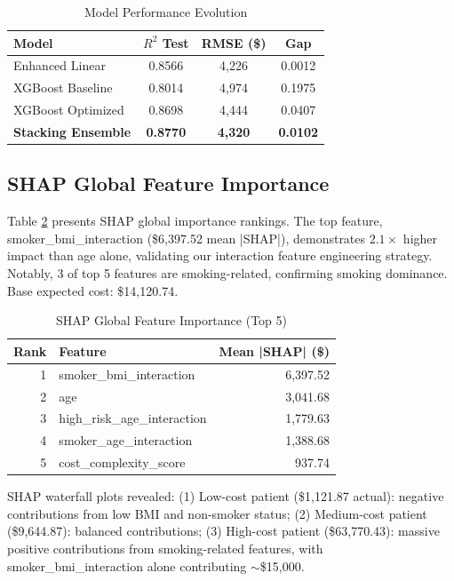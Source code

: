 \documentclass[conference]{IEEEtran}
\begin{document}
\begin{table}[htbp]
\caption{Model Performance Evolution}
\begin{center}
\begin{tabular}{|l|c|c|c|}
\hline
\textbf{Model} & \textbf{$R^2$ Test} & \textbf{RMSE (\$)} & \textbf{Gap} \\
\hline
Enhanced Linear & 0.8566 & 4,226 & 0.0012 \\
XGBoost Baseline & 0.8014 & 4,974 & 0.1975 \\
XGBoost Optimized & 0.8698 & 4,444 & 0.0407 \\
\textbf{Stacking Ensemble} & \textbf{0.8770} & \textbf{4,320} & \textbf{0.0102} \\
\hline
\end{tabular}
\label{tab:performance}
\end{center}
\end{table}

\subsection{SHAP Global Feature Importance}
Table \ref{tab:shap} presents SHAP global importance rankings. The top feature, smoker\_bmi\_interaction (\$6,397.52 mean |SHAP|), demonstrates $2.1\times$ higher impact than age alone, validating our interaction feature engineering strategy. Notably, 3 of top 5 features are smoking-related, confirming smoking dominance. Base expected cost: \$14,120.74.

\begin{table}[htbp]
\caption{SHAP Global Feature Importance (Top 5)}
\begin{center}
\begin{tabular}{|r|l|r|}
\hline
\textbf{Rank} & \textbf{Feature} & \textbf{Mean |SHAP| (\$)} \\
\hline
1 & smoker\_bmi\_interaction & 6,397.52 \\
2 & age & 3,041.68 \\
3 & high\_risk\_age\_interaction & 1,779.63 \\
4 & smoker\_age\_interaction & 1,388.68 \\
5 & cost\_complexity\_score & 937.74 \\
\hline
\end{tabular}
\label{tab:shap}
\end{center}
\end{table}

SHAP waterfall plots revealed: (1) Low-cost patient (\$1,121.87 actual): negative contributions from low BMI and non-smoker status; (2) Medium-cost patient (\$9,644.87): balanced contributions; (3) High-cost patient (\$63,770.43): massive positive contributions from smoking-related features, with smoker\_bmi\_interaction alone contributing $\sim$\$15,000.
\end{document}
